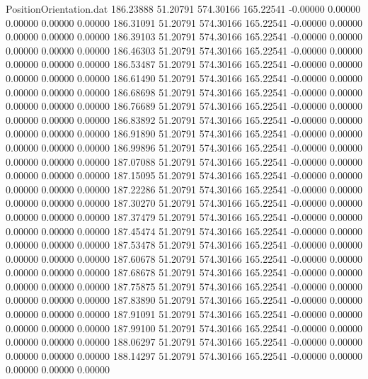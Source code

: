 \begin{filecontents}{PositionOrientation.dat}
 186.23888   51.20791  574.30166   165.22541   -0.00000    0.00000    0.00000    0.00000    0.00000
 186.31091   51.20791  574.30166   165.22541   -0.00000    0.00000    0.00000    0.00000    0.00000
 186.39103   51.20791  574.30166   165.22541   -0.00000    0.00000    0.00000    0.00000    0.00000
 186.46303   51.20791  574.30166   165.22541   -0.00000    0.00000    0.00000    0.00000    0.00000
 186.53487   51.20791  574.30166   165.22541   -0.00000    0.00000    0.00000    0.00000    0.00000
 186.61490   51.20791  574.30166   165.22541   -0.00000    0.00000    0.00000    0.00000    0.00000
 186.68698   51.20791  574.30166   165.22541   -0.00000    0.00000    0.00000    0.00000    0.00000
 186.76689   51.20791  574.30166   165.22541   -0.00000    0.00000    0.00000    0.00000    0.00000
 186.83892   51.20791  574.30166   165.22541   -0.00000    0.00000    0.00000    0.00000    0.00000
 186.91890   51.20791  574.30166   165.22541   -0.00000    0.00000    0.00000    0.00000    0.00000
 186.99896   51.20791  574.30166   165.22541   -0.00000    0.00000    0.00000    0.00000    0.00000
 187.07088   51.20791  574.30166   165.22541   -0.00000    0.00000    0.00000    0.00000    0.00000
 187.15095   51.20791  574.30166   165.22541   -0.00000    0.00000    0.00000    0.00000    0.00000
 187.22286   51.20791  574.30166   165.22541   -0.00000    0.00000    0.00000    0.00000    0.00000
 187.30270   51.20791  574.30166   165.22541   -0.00000    0.00000    0.00000    0.00000    0.00000
 187.37479   51.20791  574.30166   165.22541   -0.00000    0.00000    0.00000    0.00000    0.00000
 187.45474   51.20791  574.30166   165.22541   -0.00000    0.00000    0.00000    0.00000    0.00000
 187.53478   51.20791  574.30166   165.22541   -0.00000    0.00000    0.00000    0.00000    0.00000
 187.60678   51.20791  574.30166   165.22541   -0.00000    0.00000    0.00000    0.00000    0.00000
 187.68678   51.20791  574.30166   165.22541   -0.00000    0.00000    0.00000    0.00000    0.00000
 187.75875   51.20791  574.30166   165.22541   -0.00000    0.00000    0.00000    0.00000    0.00000
 187.83890   51.20791  574.30166   165.22541   -0.00000    0.00000    0.00000    0.00000    0.00000
 187.91091   51.20791  574.30166   165.22541   -0.00000    0.00000    0.00000    0.00000    0.00000
 187.99100   51.20791  574.30166   165.22541   -0.00000    0.00000    0.00000    0.00000    0.00000
 188.06297   51.20791  574.30166   165.22541   -0.00000    0.00000    0.00000    0.00000    0.00000
 188.14297   51.20791  574.30166   165.22541   -0.00000    0.00000    0.00000    0.00000    0.00000

\end{filecontents}
